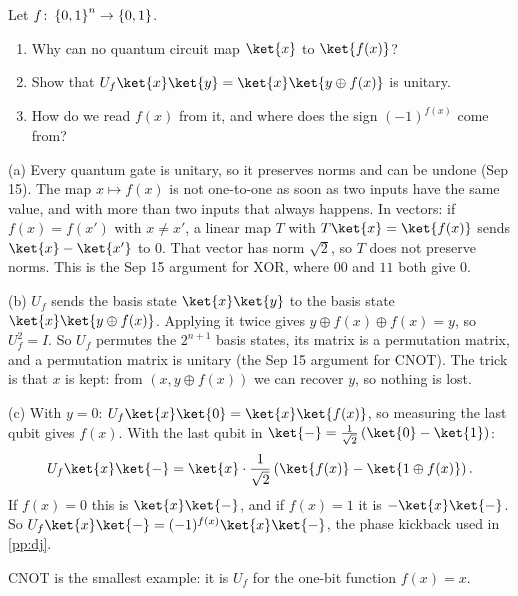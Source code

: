 \begin{exercisebox}
\begin{pproblem}\label{pp:uf}
    Let $f \colon \left\lbrace0,1\right\rbrace^n \to \left\lbrace0,1\right\rbrace$.
    \begin{enumerate}[label=(\alph*)]
        \item Why can no quantum circuit map $\ket{x}$ to $\ket{f(x)}$?
        \item Show that $U_f \ket{x}\ket{y} = \ket{x}\ket{y \oplus f(x)}$ is unitary.
        \item How do we read $f(x)$ from it, and where does the sign $(-1)^{f(x)}$ come from?
    \end{enumerate}
\end{pproblem}
\tcblower
\begin{wsolution}
    (a) Every quantum gate is unitary, so it preserves norms and can be undone (Sep 15). The map
    $x \mapsto f(x)$ is not one-to-one as soon as two inputs have the same value, and with more than
    two inputs that always happens. In vectors: if $f(x) = f(x')$ with $x \neq x'$, a linear map $T$
    with $T\ket{x} = \ket{f(x)}$ sends $\ket{x} - \ket{x'}$ to $0$. That vector has norm $\sqrt{2}$,
    so $T$ does not preserve norms. This is the Sep 15 argument for XOR, where $00$ and $11$ both
    give $0$.

    (b) $U_f$ sends the basis state $\ket{x}\ket{y}$ to the basis state
    $\ket{x}\ket{y \oplus f(x)}$. Applying it twice gives $y \oplus f(x) \oplus f(x) = y$, so
    $U_f^2 = I$. So $U_f$ permutes the $2^{n+1}$ basis states, its matrix is a permutation matrix,
    and a permutation matrix is unitary (the Sep 15 argument for CNOT). The trick is that $x$ is
    kept: from $(x, y \oplus f(x))$ we can recover $y$, so nothing is lost.

    (c) With $y = 0$: $U_f \ket{x}\ket{0} = \ket{x}\ket{f(x)}$, so measuring the last qubit gives
    $f(x)$. With the last qubit in $\ket{-} = \frac{1}{\sqrt{2}}\left(\ket{0} - \ket{1}\right)$:
    \[U_f \ket{x}\ket{-} = \ket{x} \cdot \frac{1}{\sqrt{2}}\left(\ket{f(x)} - \ket{1 \oplus f(x)}\right).\]
    If $f(x) = 0$ this is $\ket{x}\ket{-}$, and if $f(x) = 1$ it is $-\ket{x}\ket{-}$. So
    $U_f \ket{x}\ket{-} = (-1)^{f(x)} \ket{x}\ket{-}$, the phase kickback used in \cref{pp:dj}.

    CNOT is the smallest example: it is $U_f$ for the one-bit function $f(x) = x$.
\end{wsolution}
\end{exercisebox}


